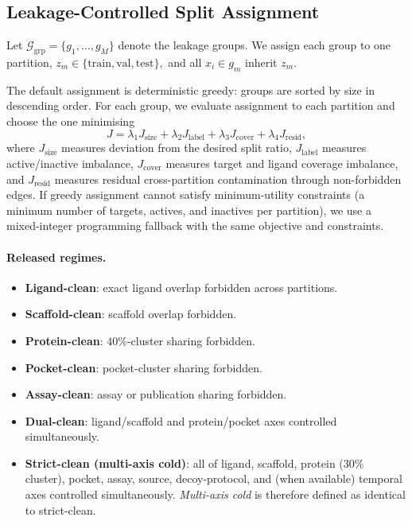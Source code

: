 \documentclass[11pt]{article}
\begin{document}
\subsection{Leakage-Controlled Split Assignment}

Let \(\mathcal{G}_{\mathrm{grp}} = \{g_1, \ldots, g_M\}\) denote the leakage groups. We assign each group to one partition,
\(
z_m \in \{\mathrm{train}, \mathrm{val}, \mathrm{test}\},
\)
and all \(x_i \in g_m\) inherit \(z_m\).

The default assignment is deterministic greedy: groups are sorted by size in descending order. For each group, we evaluate assignment to each partition and choose the one minimising
\[
J = \lambda_1 J_{\mathrm{size}} + \lambda_2 J_{\mathrm{label}} + \lambda_3 J_{\mathrm{cover}} + \lambda_4 J_{\mathrm{resid}},
\]
where \(J_{\mathrm{size}}\) measures deviation from the desired split ratio, \(J_{\mathrm{label}}\) measures active/inactive imbalance, \(J_{\mathrm{cover}}\) measures target and ligand coverage imbalance, and \(J_{\mathrm{resid}}\) measures residual cross-partition contamination through non-forbidden edges. If greedy assignment cannot satisfy minimum-utility constraints (a minimum number of targets, actives, and inactives per partition), we use a mixed-integer programming fallback with the same objective and constraints.

\paragraph{Released regimes.}
\begin{itemize}[leftmargin=*]
    \item \textbf{Ligand-clean}: exact ligand overlap forbidden across partitions.
    \item \textbf{Scaffold-clean}: scaffold overlap forbidden.
    \item \textbf{Protein-clean}: \(40\%\)-cluster sharing forbidden.
    \item \textbf{Pocket-clean}: pocket-cluster sharing forbidden.
    \item \textbf{Assay-clean}: assay or publication sharing forbidden.
    \item \textbf{Dual-clean}: ligand/scaffold and protein/pocket axes controlled simultaneously.
    \item \textbf{Strict-clean (multi-axis cold)}: all of ligand, scaffold, protein (30\% cluster), pocket, assay, source, decoy-protocol, and (when available) temporal axes controlled simultaneously. \emph{Multi-axis cold} is therefore defined as identical to strict-clean.
\end{itemize}
\end{document}
